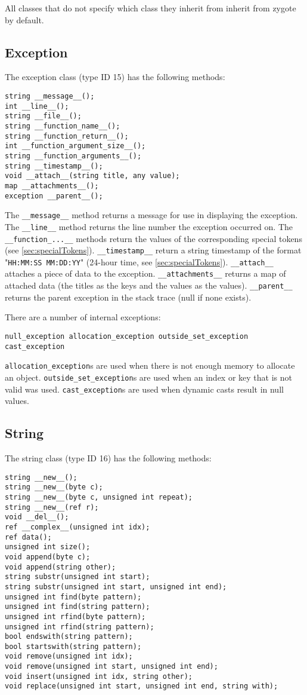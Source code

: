 \documentclass[10pt,a4paper]{article}
\begin{document}
All classes that do not specify which class they inherit from inherit from zygote by default.

\subsection{Exception}
The exception class (type ID 15) has the following methods:
\begin{verbatim}
string __message__();
int __line__();
string __file__();
string __function_name__();
string __function_return__();
int __function_argument_size__();
string __function_arguments__();
string __timestamp__();
void __attach__(string title, any value);
map __attachments__();
exception __parent__();
\end{verbatim}

The \verb|__message__| method returns a message for use in displaying the exception. The \verb|__line__| method returns the line number the exception occurred on. The \verb|__function_...__| methods return the values of the corresponding special tokens (see \ref{sec:specialTokens}). \verb|__timestamp__| return a string timestamp of the format "\verb|HH:MM:SS MM:DD:YY|" (24-hour time, see \ref{sec:specialTokens}). \verb|__attach__| attaches a piece of data to the exception. \verb|__attachments__| returns a map of attached data (the titles as the keys and the values as the values). \verb|__parent__| returns the parent exception in the stack trace (null if none exists).

There are a number of internal exceptions:
\begin{verbatim}
null_exception allocation_exception outside_set_exception
cast_exception
\end{verbatim}

\verb|allocation_exception|s are used when there is not enough memory to allocate an object. \verb|outside_set_exception|s are used when an index or key that is not valid was used. \verb|cast_exception|s are used when dynamic casts result in null values.

\subsection{String}
\label{sec:stringClass}
The string class (type ID 16) has the following methods:
\begin{verbatim}
string __new__();
string __new__(byte c);
string __new__(byte c, unsigned int repeat);
string __new__(ref r);
void __del__();
ref __complex__(unsigned int idx);
ref data();
unsigned int size();
void append(byte c);
void append(string other);
string substr(unsigned int start);
string substr(unsigned int start, unsigned int end);
unsigned int find(byte pattern);
unsigned int find(string pattern);
unsigned int rfind(byte pattern);
unsigned int rfind(string pattern);
bool endswith(string pattern);
bool startswith(string pattern);
void remove(unsigned int idx);
void remove(unsigned int start, unsigned int end);
void insert(unsigned int idx, string other);
void replace(unsigned int start, unsigned int end, string with);
\end{verbatim}
\end{document}

